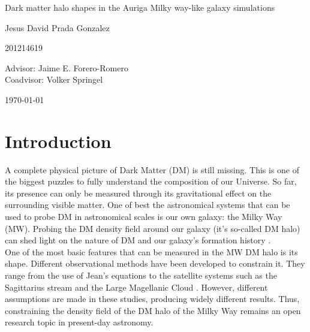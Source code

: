 \documentclass[12pt]{article}
\begin{document}
\begin{center}
\Huge
Dark matter halo shapes in the Auriga Milky way-like galaxy simulations

\vspace{3mm}
\Large Jesus David Prada Gonzalez

\large
201214619


\vspace{2mm}
\Large
Advisor: Jaime E. Forero-Romero\\
Coadvisor: Volker Springel
\normalsize
\vspace{2mm}

\today
\end{center}


\normalsize
\section{Introduction}


A complete physical picture of Dark Matter (DM) is still missing.
This is one of the biggest puzzles to fully understand the composition of our Universe.
So far, its presence can only be measured through its gravitational effect on the surrounding visible matter. 
One of best the astronomical systems that can be used to probe DM in astronomical scales is our own galaxy: the Milky Way (MW).
Probing the DM density field around our galaxy (it's so-called DM halo) can shed light on the nature of DM \cite{Nipoti,ReadMoore} and our galaxy's formation history \cite{Read1,Read2,Vera-Ciro2011}.\\

One of the most basic features that can be measured in the MW DM halo is its shape. 
Different observational methods have been developed to constrain it. 
They range from the use of Jean's equations \cite{Loebman2012} to the satellite systems such as the Sagittarius stream and the Large Magellanic Cloud \cite{Vera-Ciro2013,Deg2012,LawMajewski2010}. 
However, different assumptions are made in these studies, producing widely different results.
Thus, constraining the density field of the DM halo of the Milky Way remains an open research topic in present-day astronomy.\\ 
\end{document}
